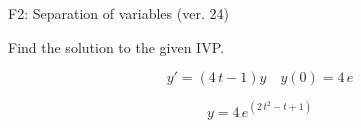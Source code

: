 \begin{exercise}
  \begin{exerciseTitle}F2: Separation of variables (ver. 24)\end{exerciseTitle}
  \begin{exerciseStatement}
    
Find the solution to the given IVP.

    
\[y'=( 4 \, t - 1 )y\hspace{1em} y(0)= 4 \, e\]

  \end{exerciseStatement}
  \begin{exerciseAnswer}
    
\[y= 4 \, e^{\left(2 \, t^{2} - t + 1\right)}\]

  \end{exerciseAnswer}
\end{exercise}